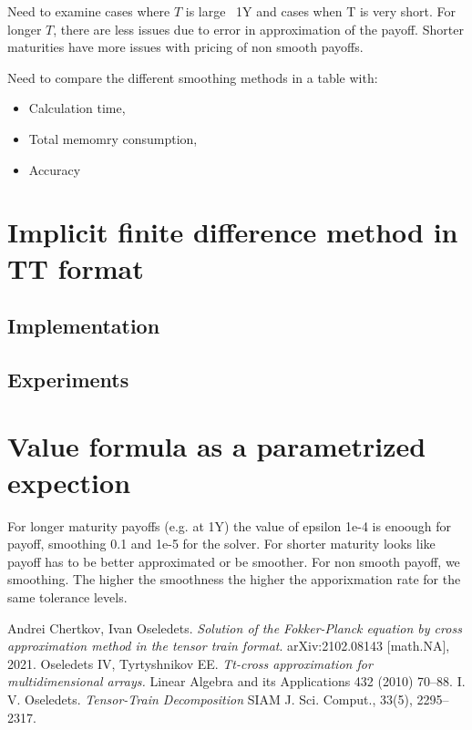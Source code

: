 \documentclass{article}
\begin{document}
Need to examine cases where $T$ is large ~1Y and cases when T is very short. For longer $T$, there are less issues due to error in 
approximation of the payoff. Shorter maturities have more issues with pricing of non smooth payoffs.

Need to compare the different smoothing methods in a table with:
\begin{itemize}
    \item Calculation time,
    \item Total memomry consumption,
    \item Accuracy
\end{itemize}

\section{Implicit finite difference method in TT format}
\subsection{Implementation}
\subsection{Experiments}

\section{Value formula as a parametrized expection}
  

For longer maturity payoffs (e.g. at 1Y) the value of epsilon 1e-4 is enoough for payoff, smoothing 0.1 and 1e-5 for the solver.
For shorter maturity looks like payoff has to be better approximated or be smoother.
For non smooth payoff, we smoothing. The higher the smoothness the higher the apporixmation rate for the same tolerance levels.

\begin{thebibliography}{9}
        Andrei Chertkov, Ivan Oseledets. 
        \textit{Solution of the Fokker-Planck equation by cross approximation method in the tensor train format}. 
        arXiv:2102.08143 [math.NA], 2021.
        Oseledets IV, Tyrtyshnikov EE.
        \textit{Tt-cross approximation for multidimensional arrays.} 
        Linear Algebra and its Applications 432 (2010) 70–88.
    I. V. Oseledets.
    \textit{Tensor-Train Decomposition}
    SIAM J. Sci. Comput., 33(5), 2295–2317.
\end{thebibliography}
\end{document}
